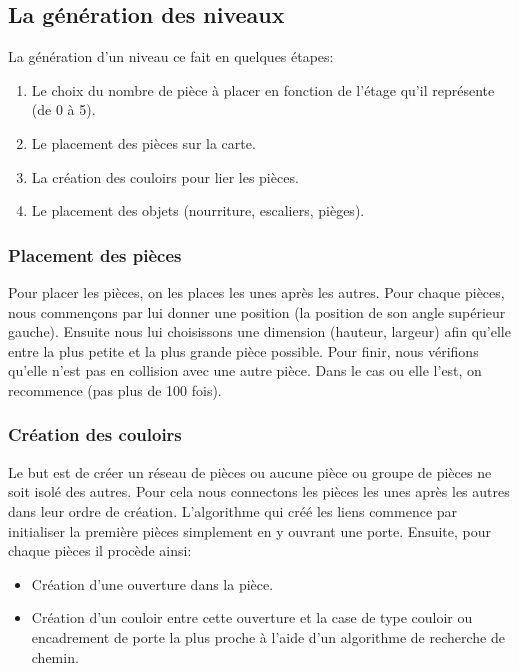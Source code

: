 \documentclass[11pt]{report}
\begin{document}
		\subsection{La génération des niveaux}
		
		La génération d'un niveau ce fait en quelques étapes:
		\begin{enumerate}
			\item Le choix du nombre de pièce à placer en fonction de l'étage qu'il représente (de 0 à 5).
			\item Le placement des pièces sur la carte.
			\item La création des couloirs pour lier les pièces.
			\item Le placement des objets (nourriture, escaliers, pièges).
		\end{enumerate}
		
			\subsubsection{Placement des pièces}
			
			Pour placer les pièces, on les places les unes après les autres. Pour chaque pièces, nous commençons par lui donner une position (la position de son angle supérieur gauche). Ensuite nous lui choisissons une dimension (hauteur, largeur) afin qu'elle entre la plus petite et la plus grande pièce possible.
			Pour finir, nous vérifions qu'elle n'est pas en collision avec une autre pièce.
			Dans le cas ou elle l'est, on recommence (pas plus de 100 fois).
			
			\subsubsection{Création des couloirs}
			
			Le but est de créer un réseau de pièces ou aucune pièce ou groupe de pièces ne soit isolé des autres.
			Pour cela nous connectons les pièces les unes après les autres dans leur ordre de création.
			L'algorithme qui créé les liens commence par initialiser la première pièces simplement en y ouvrant une porte.
			Ensuite, pour chaque pièces il procède ainsi:
			\begin{itemize}
				\item Création d'une ouverture dans la pièce.
				\item Création d'un couloir entre cette ouverture et la case de type couloir ou encadrement de porte la plus proche à l'aide d'un algorithme de recherche de chemin.
			\end{itemize}
		
\end{document}

